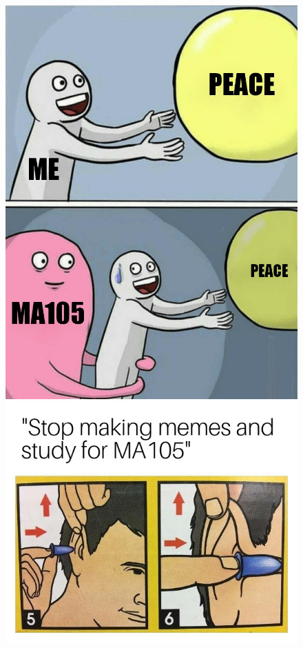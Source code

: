 \documentclass[handout, aspectratio=169]{beamer}
\begin{document}
\begin{frame} 
	\begin{figure}[t]
		\begin{minipage}{0.48\textwidth}
			\centering
			\includegraphics[width=7.5 cm]{32.jpg}
			
		\end{minipage}
		\begin{minipage}{0.48\textwidth}
			\centering
			\includegraphics[width=5 cm]{33.jpg}
			
		\end{minipage}
	\end{figure}
\end{frame}
\end{document}
